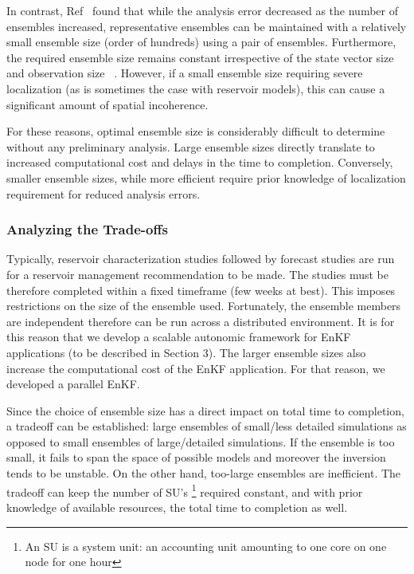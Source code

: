 \documentclass{acm_proc_article-sp}
\newcommand{\up}{\vspace*{-0.3em}}
\begin{document}
In contrast, Ref~\cite{Hout98} found that while the analysis error
decreased as the number of ensembles increased, representative
ensembles can be maintained with a relatively small ensemble size
(order of hundreds) using a pair of ensembles. Furthermore, the
required ensemble size remains constant irrespective of the state
vector size and observation size ~\cite{Mitchell02}. However, if a
small ensemble size requiring severe localization (as is sometimes the
case with reservoir models), this can cause a significant amount of
spatial incoherence.


For these reasons, optimal ensemble size is considerably difficult to
determine without any preliminary analysis. Large ensemble sizes
directly translate to increased computational cost and delays in the
time to completion. Conversely, smaller ensemble sizes, while more
efficient require prior knowledge of localization requirement for
reduced analysis errors.
\up\up\up\up
\subsubsection{Analyzing the Trade-offs}  

Typically, reservoir characterization studies followed by forecast
studies are run for a reservoir management recommendation to be
made. The studies must be therefore completed within a fixed timeframe
(few weeks at best). This imposes restrictions on the size of the
ensemble used. Fortunately, the ensemble members are independent
therefore can be run across a distributed environment. It is for this
reason that we develop a scalable autonomic framework for EnKF
applications (to be described in Section 3). The larger ensemble sizes
also increase the computational cost of the EnKF application. For that
reason, we developed a parallel EnKF.

Since the choice of ensemble size has a direct impact on total time to
completion, a tradeoff can be established: large ensembles of
small/less detailed simulations as opposed to small ensembles of
large/detailed simulations. If the ensemble is too small, it fails to
span the space of possible models and moreover the inversion tends to
be unstable. On the other hand, too-large ensembles are
inefficient. The tradeoff can keep the number of SU's
\footnote{An SU is a system unit: an accounting unit
amounting to one core on one node for one hour} required
constant, and with prior knowledge of available resources, the total
time to completion as well.
\end{document}
